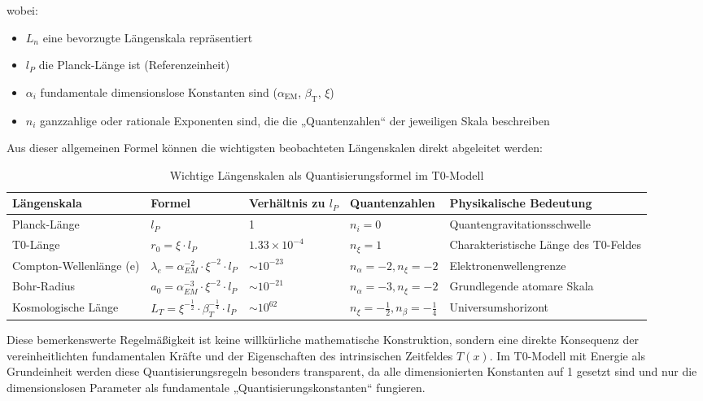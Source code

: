 \documentclass[12pt,a4paper]{article}
\newcommand{\Tfield}{T(x)}
\newcommand{\alphaEM}{\alpha_{\text{EM}}}
\newcommand{\betaT}{\beta_{\text{T}}}
\begin{document}
	wobei:
	\begin{itemize}
		\item $L_n$ eine bevorzugte Längenskala repräsentiert
		\item $l_P$ die Planck-Länge ist (Referenzeinheit)
		\item $\alpha_i$ fundamentale dimensionslose Konstanten sind ($\alphaEM$, $\betaT$, $\xi$)
		\item $n_i$ ganzzahlige oder rationale Exponenten sind, die die „Quantenzahlen“ der jeweiligen Skala beschreiben
	\end{itemize}
	
	Aus dieser allgemeinen Formel können die wichtigsten beobachteten Längenskalen direkt abgeleitet werden:
	
	\begin{table}[ht]
		\centering
		\begin{adjustbox}{scale=0.7}
			\begin{tabular}{lllll}
				\hline
				\textbf{Längenskala} & \textbf{Formel} & \textbf{Verhältnis zu $l_P$} & \textbf{Quantenzahlen} & \textbf{Physikalische Bedeutung} \\
				\hline
				Planck-Länge & $l_P$ & 1 & $n_i = 0$ & Quantengravitationsschwelle \\
				T0-Länge & $r_0 = \xi \cdot l_P$ & $1.33 \times 10^{-4}$ & $n_{\xi} = 1$ & Charakteristische Länge des T0-Feldes \\
				Compton-Wellenlänge (e) & $\lambda_e = \alpha_{EM}^{-2} \cdot \xi^{-2} \cdot l_P$ & $\sim 10^{-23}$ & $n_{\alpha} = -2, n_{\xi} = -2$ & Elektronenwellengrenze \\
				Bohr-Radius & $a_0 = \alpha_{EM}^{-3} \cdot \xi^{-2} \cdot l_P$ & $\sim 10^{-21}$ & $n_{\alpha} = -3, n_{\xi} = -2$ & Grundlegende atomare Skala \\
				Kosmologische Länge & $L_T = \xi^{-\frac{1}{2}} \cdot \beta_T^{-\frac{1}{4}} \cdot l_P$ & $\sim 10^{62}$ & $n_{\xi} = -\frac{1}{2}, n_{\beta} = -\frac{1}{4}$ & Universumshorizont \\
				\hline
			\end{tabular}
		\end{adjustbox}
		\caption{Wichtige Längenskalen als Quantisierungsformel im T0-Modell}
		\label{tab:quantized_lengths}
	\end{table}
	
	Diese bemerkenswerte Regelmäßigkeit ist keine willkürliche mathematische Konstruktion, sondern eine direkte Konsequenz der vereinheitlichten fundamentalen Kräfte und der Eigenschaften des intrinsischen Zeitfeldes $\Tfield$. Im T0-Modell mit Energie als Grundeinheit werden diese Quantisierungsregeln besonders transparent, da alle dimensionierten Konstanten auf 1 gesetzt sind und nur die dimensionslosen Parameter als fundamentale „Quantisierungskonstanten“ fungieren.
	
\end{document}
